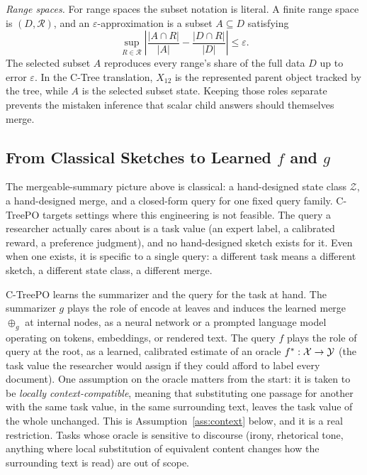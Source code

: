 \emph{Range spaces.} For range spaces the subset notation is literal. A
finite range space is \((D,\mathcal{R})\), and an
\(\varepsilon\)-approximation is a subset \(A\subseteq D\) satisfying
\[
  \sup_{R\in\mathcal{R}}
  \left|
    \frac{|A\cap R|}{|A|}
    -
    \frac{|D\cap R|}{|D|}
  \right|
  \le \varepsilon.
\]
The selected subset \(A\) reproduces every range's share of the full
data \(D\) up to error \(\varepsilon\). In the C-Tree translation,
\(X_{12}\) is the represented parent object
tracked by the tree, while \(A\) is the selected subset state.
Keeping those roles separate prevents the mistaken inference that
scalar child answers should themselves merge.

\subsection{From Classical Sketches to Learned \(f\) and \(g\)}
\label{sec:v7-from-classical-to-learned}

The mergeable-summary picture above is classical: a hand-designed state
class \(\mathcal{Z}\), a hand-designed merge, and a closed-form
\(\mathrm{query}\) for one fixed query family. C-TreePO targets
settings where this engineering is not feasible. The query a researcher
actually cares about is a task value (an expert label, a calibrated
reward, a preference judgment), and no hand-designed sketch exists for
it. Even when one exists, it is specific to a single query: a different
task means a different sketch, a different state class, a different
merge.

C-TreePO learns the summarizer and the query for the task at hand.
The summarizer \(g\) plays the role of \(\mathrm{encode}\) at leaves
and induces the learned merge \(\oplus_g\) at internal nodes, as a
neural network or a prompted language model operating on tokens,
embeddings, or rendered text. The query \(f\) plays the role of
\(\mathrm{query}\) at the root, as a learned, calibrated estimate of an
oracle \(f^\ast:\mathcal{X}\to\mathcal{Y}\) (the task value the researcher
would assign if they could afford to label every document). One
assumption on the oracle matters from the start: it is taken to be
\emph{locally context-compatible}, meaning that substituting one
passage for another with the same task value, in the same
surrounding text, leaves the task value of the whole unchanged.
This is Assumption~\ref{ass:context} below, and it is a real restriction.
Tasks whose oracle is sensitive to discourse (irony, rhetorical tone, anything
where local substitution of equivalent content changes how the
surrounding text is read) are out of scope.

